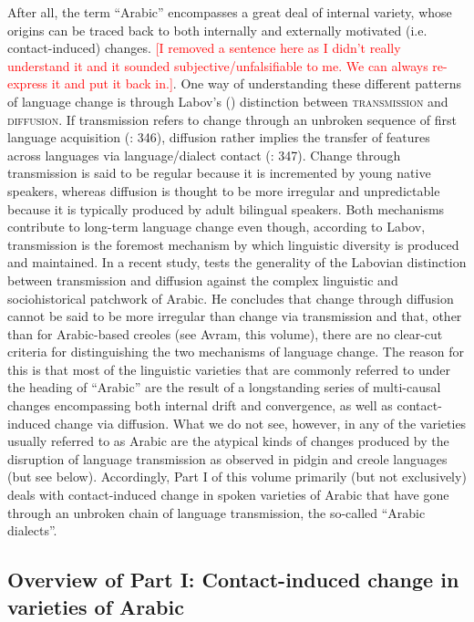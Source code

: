 \documentclass[output=paper]{langsci/langscibook}
\begin{document}
After all, the term ``Arabic'' encompasses a great deal of internal variety, whose origins can be traced back to both internally and externally motivated (i.e. contact-induced) changes. \textcolor{red}{[I removed a sentence here as I didn't really understand it and it sounded subjective/unfalsifiable to me. We can always re-express it and put it back in.]}. One way of understanding these different patterns of language change is through Labov's (\citeyear{Labov2007}) distinction between \textsc{transmission} and \textsc{diffusion}. If transmission refers to change through an unbroken sequence of first language acquisition (\citealt{Labov2007}: 346), diffusion rather implies the transfer of features across languages via language/dialect contact (\citealt{Labov2007}: 347). Change through transmission is said to be regular because it is incremented by young native speakers, whereas diffusion is thought to be more irregular and unpredictable because it is typically produced by adult bilingual speakers. Both mechanisms contribute to long-term language change even though, according to Labov, transmission is the foremost mechanism by which linguistic diversity is produced and maintained. In a recent study, \citet{Owens2018} tests the generality of the Labovian distinction between transmission and diffusion against the complex linguistic and sociohistorical patchwork of Arabic. He concludes that change through diffusion cannot be said to be more irregular than change via transmission and that, other than for Arabic-based creoles (see Avram, this volume), there are no clear-cut criteria for distinguishing the two mechanisms of language change. The reason for this is that most of the linguistic varieties that are commonly referred to under the heading of ``Arabic'' are the result of a longstanding series of multi-causal changes encompassing both internal drift and convergence, as well as contact-induced change via diffusion. What we do not see, however, in any of the varieties usually referred to as Arabic are the atypical kinds of changes produced by the disruption of language transmission as observed in pidgin and creole languages (but see below). Accordingly, Part I of this volume primarily (but not exclusively) deals with contact-induced change in spoken varieties of Arabic that have gone through an unbroken chain of language transmission, the so-called ``Arabic dialects''. 

\subsection{Overview of Part I: Contact-induced change in varieties of Arabic}
\end{document}
